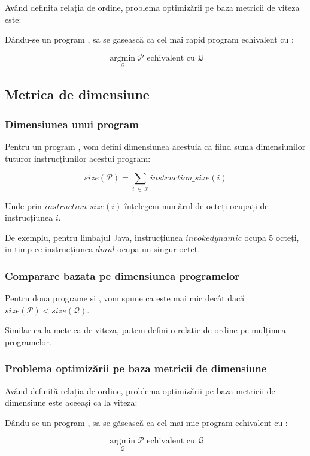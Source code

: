 Având definita relația de ordine, problema optimizării pe
baza metricii de viteza este:

Dându-se un program , sa se găsească  ca cel mai rapid
program echivalent cu :

\[
	\operatorname*{argmin}_\mathcal{Q} \mathcal{P}
	\text{ echivalent cu  } \mathcal{Q}
\]

\subsection{Metrica de dimensiune}

\subsubsection{Dimensiunea unui program}

Pentru un program , vom defini dimensiunea acestuia ca fiind
suma dimensiunilor tuturor instrucțiunilor acestui program:

\[
	size(\mathcal{P}) = \sum_{i\ \in\ \mathcal{P}} instruction\_size(i)
\]

Unde prin \( instruction\_size(i) \) înțelegem numărul de octeți
ocupați de instrucțiunea $i$.

De exemplu, pentru limbajul Java, instrucțiunea $invokedynamic$
ocupa 5 octeți, in timp ce instrucțiunea $dmul$ ocupa un singur
octet.

\subsubsection{Comparare bazata pe dimensiunea programelor}

Pentru doua programe  și , vom spune ca  este mai
mic decât  dacă \(size(\mathcal{P}) < size(\mathcal{Q})\).

Similar ca la metrica de viteza, putem defini o relație de ordine
pe mulțimea programelor.

\subsubsection{Problema optimizării pe baza metricii de
	dimensiune}

Având definită relația de ordine, problema optimizării pe
baza metricii de dimensiune este aceeași ca la viteza:

Dându-se un program , sa se găsească  ca cel mai mic
program echivalent cu :

\[
	\operatorname*{argmin}_\mathcal{Q} \mathcal{P}
	\text{ echivalent cu  } \mathcal{Q}
\]

